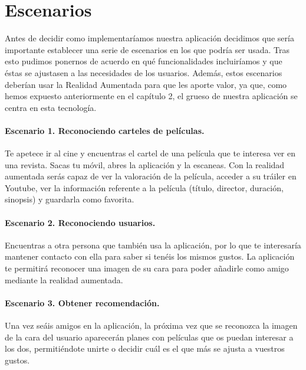 \section{Escenarios}
\label{makereference3.2}
Antes de decidir como implementaríamos nuestra aplicación decidimos que sería importante establecer una serie
de escenarios en los que podría ser usada. Tras esto pudimos ponernos de acuerdo en qué funcionalidades incluiríamos y que 
éstas se ajustasen a las necesidades de los usuarios. Además, estos escenarios deberían usar la Realidad Aumentada para que 
les aporte valor, ya que, como hemos expuesto anteriormente en el capítulo 2, el grueso de nuestra aplicación se centra en esta tecnología.

\paragraph{Escenario 1. Reconociendo carteles de películas.}
\begin{flushleft}
    Te apetece ir al cine y encuentras el cartel de una película que te interesa ver en una revista. Sacas tu móvil, abres la aplicación y 
    la escaneas. Con la realidad aumentada serás capaz de ver la valoración de la película, acceder a su tráiler en Youtube, ver la información
    referente a la película (título, director, duración, sinopsis) y guardarla como favorita.
    
\end{flushleft}
\paragraph{Escenario 2. Reconociendo usuarios.}
\begin{flushleft}
    Encuentras a otra persona que también usa la aplicación, por lo que te interesaría mantener contacto con ella para saber si tenéis los mismos 
    gustos. La aplicación te permitirá reconocer una imagen de su cara para poder añadirle como amigo mediante la realidad aumentada. 
\end{flushleft}
\paragraph{Escenario 3. Obtener recomendación.}
\begin{flushleft}
    Una vez seáis amigos en la aplicación,
    la próxima vez que se reconozca la imagen de la cara del usuario aparecerán planes con películas que os puedan interesar a los dos, permitiéndote unirte o decidir cuál es el
    que más se ajusta a vuestros gustos. 
\end{flushleft}


